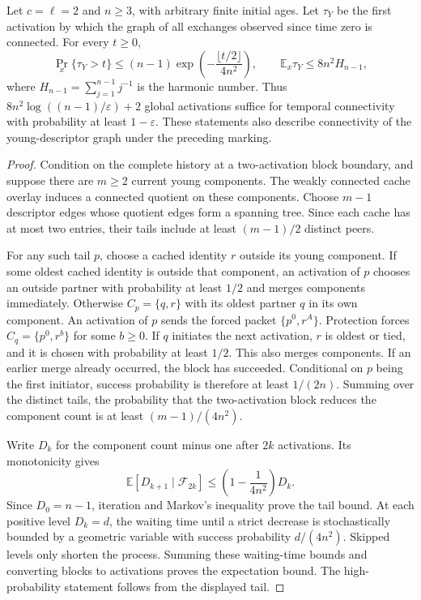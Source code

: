 \begin{proposition}
\label{prop:c2temporalconnectivity}
Let $c=\ell=2$ and $n\ge3$, with arbitrary finite initial ages.
Let $\tau_Y$ be the first activation by which the graph of all
exchanges observed since time zero is connected. For every $t\ge0$,
\[
 \Pr_x\{\tau_Y>t\}
 \le (n-1)\exp\!\left(-\frac{\lfloor t/2\rfloor}{4n^2}\right),
 \qquad
 \mathbb E_x\tau_Y\le8n^2 H_{n-1},
\]
where $H_{n-1}=\sum_{j=1}^{n-1}j^{-1}$ is the harmonic number.
Thus $8n^2\log((n-1)/\varepsilon)+2$ global activations
suffice for temporal connectivity with probability at least
$1-\varepsilon$. These statements also describe connectivity
of the young-descriptor graph under the preceding marking.
\end{proposition}
\begin{proof}
Condition on the complete history at a two-activation block
boundary, and suppose there are $m\ge2$ current young components.
The weakly connected cache overlay induces a connected quotient
on these components. Choose $m-1$ descriptor edges whose quotient
edges form a spanning tree. Since each cache has at most two
entries, their tails include at least $(m-1)/2$ distinct peers.

For any such tail $p$, choose a cached identity $r$ outside its
young component. If some oldest cached identity is outside that
component, an activation of $p$ chooses an outside partner with
probability at least $1/2$ and merges components immediately.
Otherwise $C_p=\{q,r\}$ with its oldest partner $q$ in its own
component. An activation of $p$ sends the forced packet
$\{p^0,r^A\}$. Protection forces
$C_q=\{p^0,r^b\}$ for some $b\ge0$. If $q$ initiates the next
activation, $r$ is oldest or tied, and it is chosen with
probability at least $1/2$. This also merges components.
If an earlier merge already occurred, the block has succeeded.
Conditional on $p$ being the first initiator, success probability
is therefore at least $1/(2n)$. Summing over the distinct tails,
the probability that the two-activation block reduces the
component count is at least $(m-1)/(4n^2)$.

Write $D_k$ for the component count minus one after $2k$
activations. Its monotonicity gives
\[
 \mathbb E[D_{k+1}\mid\mathcal F_{2k}]
 \le\left(1-\frac1{4n^2}\right)D_k.
\]
Since $D_0=n-1$, iteration and Markov's inequality prove the
tail bound. At each positive level $D_k=d$, the waiting time
until a strict decrease is stochastically bounded by a geometric
variable with success probability $d/(4n^2)$. Skipped levels only
shorten the process. Summing these waiting-time bounds and
converting blocks to activations proves the expectation bound.
The high-probability statement follows from the displayed tail.
\end{proof}

